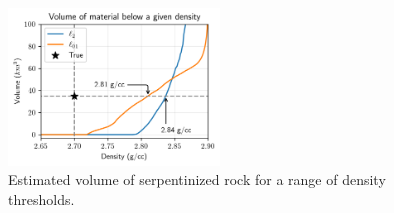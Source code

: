 \begin{figure}
    \begin{center}
    \includegraphics[width=0.5\textwidth]{figures/gravity-l2-lpq-volume}
    \end{center}
\caption{
    Estimated volume of serpentinized rock for a range of density thresholds.
}
\label{fig:gravity-l2-lpq-volume}
\end{figure}
